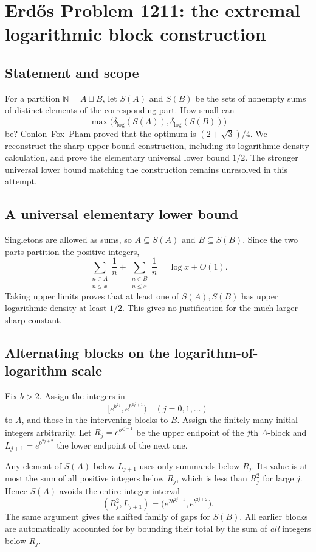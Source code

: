 \section*{Erd\H{o}s Problem 1211: the extremal logarithmic block construction}
\subsection*{Statement and scope}
For a partition $\mathbb N=A\sqcup B$, let $S(A)$ and $S(B)$ be the sets of nonempty sums of distinct elements of the corresponding part. How small can
\[
 \max\bigl(\overline\delta_{\log}(S(A)),
           \overline\delta_{\log}(S(B))\bigr)
\]
be? Conlon--Fox--Pham proved that the optimum is $(2+\sqrt3)/4$.
We reconstruct the sharp upper-bound construction, including its logarithmic-density calculation, and prove the elementary universal lower bound $1/2$. The stronger universal lower bound matching the construction remains unresolved in this attempt.

\subsection*{A universal elementary lower bound}
Singletons are allowed as sums, so $A\subseteq S(A)$ and $B\subseteq S(B)$. Since the two parts partition the positive integers,
\[
 \sum_{\substack{n\in A\\n\le x}}\frac1n+
 \sum_{\substack{n\in B\\n\le x}}\frac1n
 =\log x+O(1).
\]
Taking upper limits proves that at least one of $S(A),S(B)$ has upper logarithmic density at least $1/2$. This gives no justification for the much larger sharp constant.

\subsection*{Alternating blocks on the logarithm-of-logarithm scale}
Fix $b>2$. Assign the integers in
\[
 [e^{b^{2j}},e^{b^{2j+1}})\quad(j=0,1,\ldots)
\]
to $A$, and those in the intervening blocks to $B$. Assign the finitely many initial integers arbitrarily. Let $R_j=e^{b^{2j+1}}$ be the upper endpoint of the $j$th $A$-block and $L_{j+1}=e^{b^{2j+2}}$ the lower endpoint of the next one.

Any element of $S(A)$ below $L_{j+1}$ uses only summands below $R_j$. Its value is at most the sum of all positive integers below $R_j$, which is less than $R_j^2$ for large $j$. Hence $S(A)$ avoids the entire integer interval
\[
 (R_j^2,L_{j+1})
   =\bigl(e^{2b^{2j+1}},e^{b^{2j+2}}\bigr).
 \tag{1}
\]
The same argument gives the shifted family of gaps for $S(B)$. All earlier blocks are automatically accounted for by bounding their total by the sum of \emph{all} integers below $R_j$.

